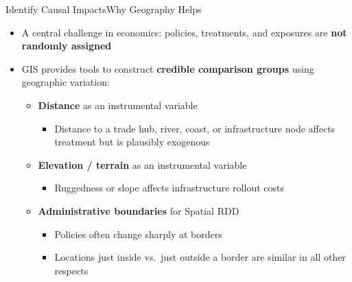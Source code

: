 \documentclass[dvipsnames,hyperref={pdfpagelabels=false}]{beamer}
\begin{document}
\begin{frame}{Identify Causal Impacts}{Why Geography Helps}
\begin{itemize}
	\item A central challenge in economics: policies, treatments, and exposures are \textbf{not randomly assigned}
	\vspace{0.2cm}
	\item GIS provides tools to construct \textbf{credible comparison groups} using geographic variation:
	\vspace{0.2cm}
	\begin{itemize}
		\item \textbf{Distance} as an instrumental variable
        		\vspace{0.2cm}
		\begin{itemize}
			\item Distance to a trade hub, river, coast, or infrastructure node affects treatment but is plausibly exogenous
		\end{itemize}
		\vspace{0.2cm}
		\item \textbf{Elevation / terrain} as an instrumental variable
        		\vspace{0.2cm}
		\begin{itemize}
			\item Ruggedness or slope affects infrastructure rollout costs
		\end{itemize}
		\vspace{0.2cm}
		\item \textbf{Administrative boundaries} for Spatial RDD
		\begin{itemize}
			\item Policies often change sharply at borders
            		\vspace{0.2cm}
			\item Locations just inside vs.\ just outside a border are similar in all other respects
		\end{itemize}
	\end{itemize}
\end{itemize}
\end{frame}
\end{document}
